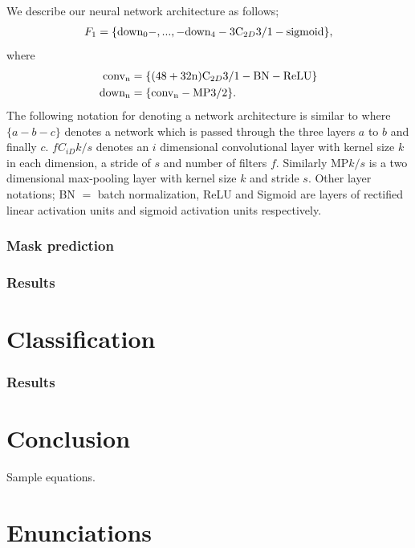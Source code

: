 \documentclass{IET}%
\begin{document}
We describe our neural network architecture as follows;
\begin{align}\label{eq:whaleconv1}
	 F_1 = \{\text{down\textsubscript{0}} - , ... , - \text{down\textsubscript{4}} - 3\text{C}_{2D}3/1 - \text{sigmoid}\}, 
\end{align}
	where 
\begin{align*}
			 \text{conv\textsubscript{n}} &= \{(48 + 32\text{n})\text{C}_{2D}3/1 - \text{BN} - \text{ReLU}\} \\	
     		 \text{down\textsubscript{n}}  &= \{\text{conv\textsubscript{n}}- \text{MP}3/2\}. \\	
\end{align*}
The following notation for denoting a network architecture is similar to \cite{graham2014fractional} where $\{a-b-c\}$ denotes a network which is passed through the three layers $a$ to $b$ and finally $c$. $fC_{iD}k/s$ denotes an $i$ dimensional convolutional layer with kernel size $k$ in each dimension, a stride of $s$ and number of filters $f$. Similarly MP$k/s$ is a two dimensional max-pooling layer with kernel size $k$ and stride $s$. Other layer notations; BN $=$ batch normalization, ReLU and Sigmoid are layers of rectified linear activation units and sigmoid activation units respectively.
\subsubsection{Mask prediction}

\subsubsection{Results}

\section{Classification}

\subsubsection{Results}

\section{Conclusion}
Sample equations.

\section{Enunciations}
\end{document}
